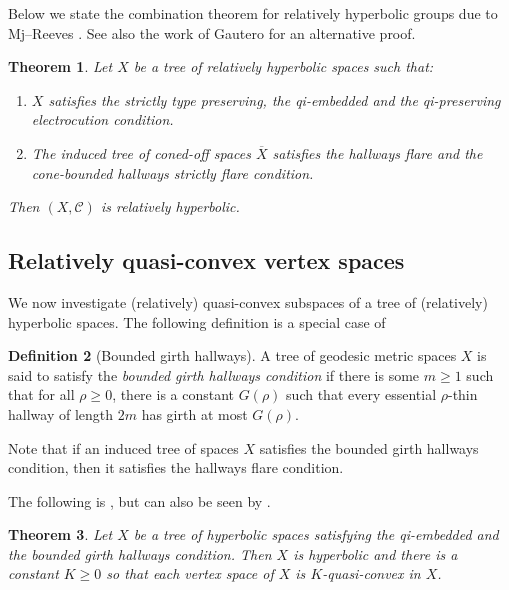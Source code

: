 \documentclass[11pt, a4paper]{amsart}
\newtheorem{theorem}{Theorem}[section]
\theoremstyle{definition}
\newtheorem{definition}[theorem]{Definition}
\begin{document}
Below we state the combination theorem for relatively hyperbolic groups due to Mj--Reeves \cite{MR08}. See also the work of Gautero \cite{Ga16} for an alternative proof. 

\begin{theorem}
\label{thm:combination}
Let $X$ be a tree of relatively hyperbolic spaces such that:
\begin{enumerate}
\item $X$ satisfies the strictly type preserving, the qi-embedded and the qi-preserving electrocution condition.
\item The induced tree of coned-off spaces $\overline{X}$ satisfies the hallways flare and the cone-bounded hallways strictly flare condition.
\end{enumerate}
Then $(X, \mathcal{C})$ is relatively hyperbolic.
\end{theorem}



\subsection{Relatively quasi-convex vertex spaces}

We now investigate (relatively) quasi-convex subspaces of a tree of (relatively) hyperbolic spaces. The following definition is a special case of \cite[Definition 4.26]{Mj20}


\begin{definition}[Bounded girth hallways]
\label{defn:bounded_hallways}
A tree of geodesic metric spaces $X$ is said to satisfy the \emph{bounded girth hallways condition} if there is some $m\geqslant 1$ such that for all $\rho\geqslant 0$, there is a constant $G(\rho)$ such that every essential $\rho$-thin hallway of length $2m$ has girth at most $G(\rho)$.
\end{definition}

Note that if an induced tree of spaces $X$ satisfies the bounded girth hallways condition, then it satisfies the hallways flare condition.

The following is \cite[Corollary 4.3]{Mi04}, but can also be seen by \cite[Proposition 4.27]{Mj20}.

\begin{theorem}
\label{thm:bounded_hallways}
Let $X$ be a tree of hyperbolic spaces satisfying the qi-embedded and the bounded girth hallways condition. Then $X$ is hyperbolic and there is a constant $K\geqslant 0$ so that each vertex space of $X$ is $K$-quasi-convex in $X$.
\end{theorem}
\end{document}

